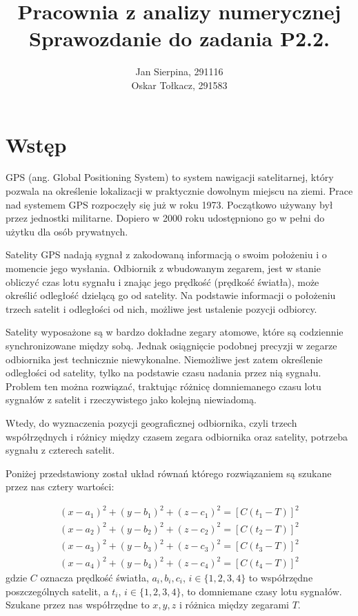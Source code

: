 \documentclass[]{mwart}
\title{Pracownia z analizy numerycznej \\
	\large Sprawozdanie do zadania P2.2.}
\author{Jan Sierpina, 291116 \\
	Oskar Tołkacz, 291583}
\theoremstyle{definition}
\begin{document}
\maketitle

\section*{Wstęp}
GPS (ang. Global Positioning System) to system nawigacji satelitarnej, który pozwala na określenie lokalizacji w praktycznie dowolnym miejscu na ziemi. Prace nad systemem GPS rozpoczęły się już w roku 1973. Początkowo używany był przez jednostki militarne. Dopiero w 2000 roku udostępniono go w pełni do użytku dla osób prywatnych.

Satelity GPS nadają sygnał z zakodowaną informacją o swoim położeniu i o momencie jego wysłania. Odbiornik z wbudowanym zegarem, jest w stanie obliczyć czas lotu sygnału i znając jego prędkość (prędkość światła), może określić odległość dzielącą go od satelity. Na podstawie informacji o położeniu trzech satelit i odległości od nich, możliwe jest ustalenie pozycji odbiorcy.

Satelity wyposażone są w bardzo dokładne zegary atomowe, które są codziennie synchronizowane między sobą. Jednak osiągnięcie podobnej precyzji w zegarze odbiornika jest technicznie niewykonalne. Niemożliwe jest zatem określenie odległości od satelity, tylko na podstawie czasu nadania przez nią sygnału. Problem ten można rozwiązać, traktując różnicę domniemanego czasu lotu sygnałów z satelit i rzeczywistego jako kolejną niewiadomą.

Wtedy, do wyznaczenia pozycji geograficznej odbiornika, czyli trzech współrzędnych i różnicy między czasem zegara odbiornika oraz satelity, potrzeba sygnału z czterech satelit.

Poniżej przedstawiony został układ równań którego rozwiązaniem są szukane przez nas cztery wartości:

\begin{equation*}
		\begin{aligned}
		(x - a_1)^2 + (y - b_1)^2 + (z - c_1)^2 = [C(t_1 - T)]^2 \\
		(x - a_2)^2 + (y - b_2)^2 + (z - c_2)^2 = [C(t_2 - T)]^2 \\
		(x - a_3)^2 + (y - b_3)^2 + (z - c_3)^2 = [C(t_3 - T)]^2 \\
		(x - a_4)^2 + (y - b_4)^2 + (z - c_4)^2 = [C(t_4 - T)]^2
	\end{aligned}
\end{equation*}
gdzie $C$ oznacza prędkość światła, $a_i, b_i, c_i$, $i \in \{1,2,3,4\}$ to współrzędne poszczególnych satelit, a $t_i$, $i \in \{1,2,3,4\}$, to domniemane czasy lotu sygnałów. Szukane przez nas współrzędne to $x, y, z$ i różnica między zegarami $T$.
\end{document}
